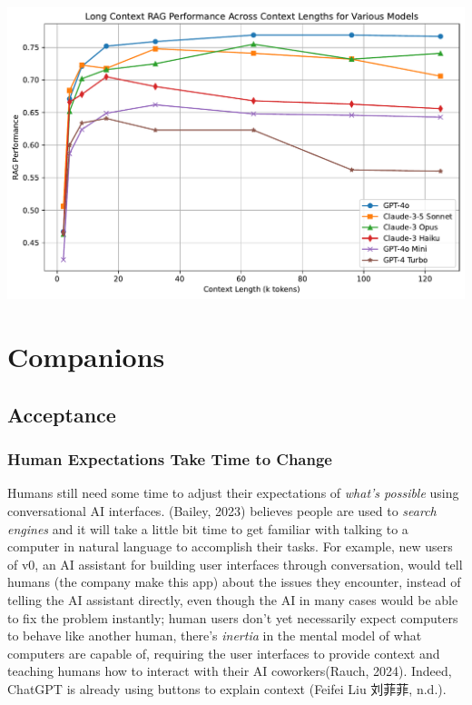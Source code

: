 \documentclass[
  letterpaper,
  DIV=11,
  numbers=noendperiod]{scrartcl}
\begin{document}
\includegraphics{_thesis_files/figure-pdf/cell-32-output-1.pdf}

\section{Companions}\label{companions}

\subsection{Acceptance}\label{acceptance}

\subsubsection{Human Expectations Take Time to
Change}\label{human-expectations-take-time-to-change}

Humans still need some time to adjust their expectations of \emph{what's
possible} using conversational AI interfaces. (Bailey, 2023) believes
people are used to \emph{search engines} and it will take a little bit
time to get familiar with talking to a computer in natural language to
accomplish their tasks. For example, new users of v0, an AI assistant
for building user interfaces through conversation, would tell humans
(the company make this app) about the issues they encounter, instead of
telling the AI assistant directly, even though the AI in many cases
would be able to fix the problem instantly; human users don't yet
necessarily expect computers to behave like another human, there's
\emph{inertia} in the mental model of what computers are capable of,
requiring the user interfaces to provide context and teaching humans how
to interact with their AI coworkers(Rauch, 2024). Indeed, ChatGPT is
already using buttons to explain context (Feifei Liu 刘菲菲, n.d.).
\end{document}
